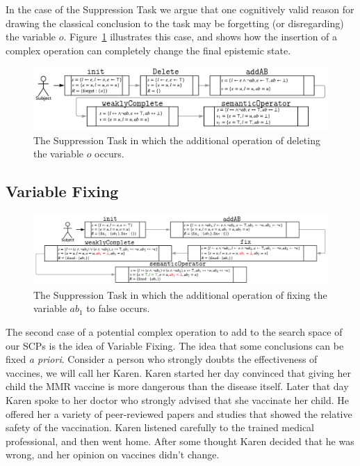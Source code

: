 \documentclass[
11pt, %
english, %
singlespacing, %
headsepline, %
]{MastersDoctoralThesis} %
\begin{document}
In the case of the Suppression Task we argue that one cognitively valid reason for drawing the classical conclusion to the task may be forgetting (or disregarding) the variable $o$. Figure~\ref{fig:supmod} illustrates this case, and shows how the insertion of a complex operation can completely change the final epistemic state.

\begin{figure}
\begin{center}
\includegraphics[width=0.85\linewidth]{suppressionSCP_mod}
\end{center}

\caption{The Suppression Task in which the additional operation of deleting the variable $o$ occurs.}
\label{fig:supmod}
\end{figure}

\subsection*{Variable Fixing} \label{ssec:variableFixing}

\begin{figure}
\begin{center}
\includegraphics[width=\linewidth]{suppressionSCP_mod2}
\end{center}

\caption{The Suppression Task in which the additional operation of fixing the variable $ab_1$ to false occurs.}
\label{fig:supmod2}
\end{figure}

The second case of a potential complex operation to add to the search space of our SCPs is the idea of Variable Fixing. The idea that some  conclusions can be fixed \textit{a priori}. Consider a person who strongly doubts the effectiveness of vaccines, we will call her Karen. Karen started her day convinced that giving her child the MMR vaccine is more dangerous than the disease itself. Later that day Karen spoke to her doctor who strongly advised that she vaccinate her child. He offered her a variety of peer-reviewed papers and studies that showed the relative safety of the vaccination. Karen listened carefully to the trained medical professional, and then went home. After some thought Karen decided that he was wrong, and her opinion on vaccines didn't change.
\end{document}
